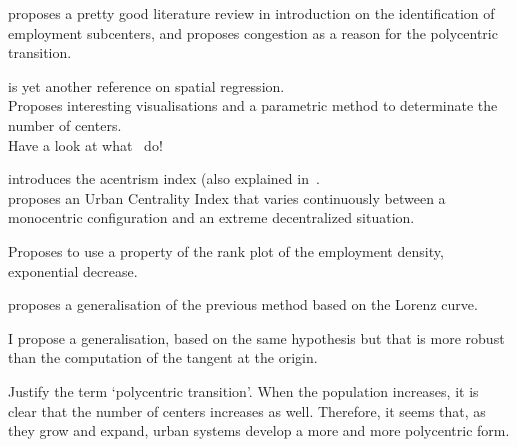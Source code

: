 \cite{McMillen:2003} proposes a pretty good literature review in introduction on
the identification of employment subcenters, and proposes congestion as a reason
for the polycentric transition.


\cite{Griffith:2007} is yet another reference on spatial regression.\\

\cite{Redfearn:2007} Proposes interesting visualisations and a parametric method
to determinate the number of centers.\\

Have a look at what~\cite{Berroir:2008} do!


\cite{LeNechet:2010} introduces the acentrism index (also explained
in~\cite{LeNechet:2015}.\\

\cite{Pereira:2013} proposes an Urban Centrality Index that varies continuously
between a monocentric configuration and an extreme decentralized situation.

\cite{Louf:2013_polycentric} Proposes to use a property of the rank plot of the
employment density, exponential decrease.

\cite{Louail:2014} proposes a generalisation of the previous method based on the
Lorenz curve.

I propose a generalisation, based on the same hypothesis but that is more robust
than the computation of the tangent at the origin.

Justify the term `polycentric transition'. When the population increases, it is
clear that the number of centers increases as well. Therefore, it seems that, as
they grow and expand, urban systems develop a more and more polycentric form.

